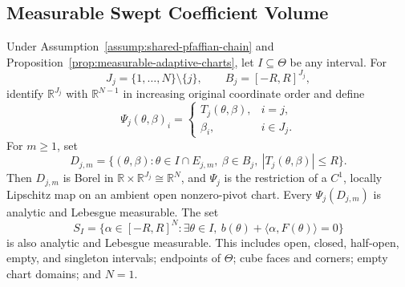 \subsection{Measurable Swept Coefficient Volume}

\begin{lemma}
\label{lem:analytic-chart-events}
Under Assumption~\ref{assump:shared-pfaffian-chain} and
Proposition~\ref{prop:measurable-adaptive-charts}, let
$I\subseteq\Theta$ be any interval.  For
\[
J_j=\{1,\ldots,N\}\setminus\{j\},
\qquad B_j=[-R,R]^{J_j},
\]
identify $\mathbb R^{J_j}$ with $\mathbb R^{N-1}$ in increasing original
coordinate order and define
\[
\Psi_j(\theta,\beta)_i=
\begin{cases}
T_j(\theta,\beta),&i=j,\\
\beta_i,&i\in J_j.
\end{cases}
\tag{A8}
\]
For $m\geq1$, set
\[
D_{j,m}=\{(\theta,\beta):
 \theta\in I\cap E_{j,m},\ \beta\in B_j,\
 |T_j(\theta,\beta)|\leq R\}.
\tag{A9}
\]
Then $D_{j,m}$ is Borel in
$\mathbb R\times\mathbb R^{J_j}\cong\mathbb R^N$, and $\Psi_j$ is the
restriction of a $C^1$, locally Lipschitz map on an ambient open
nonzero-pivot chart.  Every $\Psi_j(D_{j,m})$ is analytic and Lebesgue
measurable.  The set
\[
S_I=\{\alpha\in[-R,R]^N:\exists\theta\in I,\
 b(\theta)+\langle\alpha,F(\theta)\rangle=0\}
\tag{A10}
\]
is also analytic and Lebesgue measurable.  This includes open, closed,
half-open, empty, and singleton intervals; endpoints of $\Theta$; cube
faces and corners; empty chart domains; and $N=1$.
\end{lemma}

